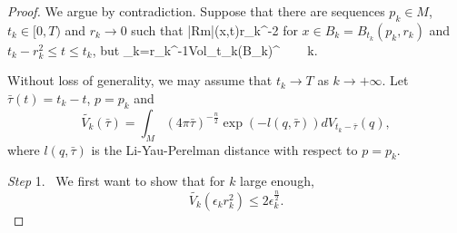 \begin{proof}
We argue by contradiction. Suppose that there are sequences
$p_k\in M$, $t_k\in[0,T)$ and $r_k\rightarrow 0$ such that \be
|Rm|(x,t)\leq r_k^{-2} %
\ee for $x\in B_k=B_{t_k}(p_k,r_k)$ and $t_k-r_k^2\leq t\leq t_k$,
but \be \epsilon_k=r_k^{-1}Vol_{t_k}(B_k)^{} \
\  \ k\rightarrow \infty. %
\ee

Without loss of generality, we may assume that $t_k\rightarrow T$
as $k\rightarrow +\infty$. \vskip 0.1cm \noindent Let
$\bar{\tau}(t)=t_k-t$, $p=p_k$ and
$$
\tilde{V_k}(\bar{\tau})=\int_M(4\pi\bar{\tau})^{-\frac{n}{2}}
\exp(-l(q,\bar{\tau}))dV_{t_k-\bar{\tau}}(q),
$$
where $l(q,\bar\tau)$ is the Li-Yau-Perelman distance with respect
to $p=p_k$.

\medskip
{\it Step} 1. \ We first want to show that for $k$ large enough,
$$
\tilde{V_k}(\epsilon_kr_k^2)\leq2\epsilon_k^\frac{n}{2}.
$$


\end{proof}
